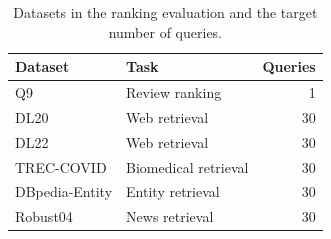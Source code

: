 \begin{table}[t]
  \centering\small
  \caption{Datasets in the ranking evaluation and the target number of queries.}
  \label{tab:datasets}
  \begin{tabular}{@{}llr@{}}
    \toprule
    Dataset & Task & Queries \\
    \midrule
    Q9 & Review ranking & 1 \\
    DL20 & Web retrieval & 30 \\
    DL22 & Web retrieval & 30 \\
    TREC-COVID & Biomedical retrieval & 30 \\
    DBpedia-Entity & Entity retrieval & 30 \\
    Robust04 & News retrieval & 30 \\
    \bottomrule
  \end{tabular}
\end{table}
